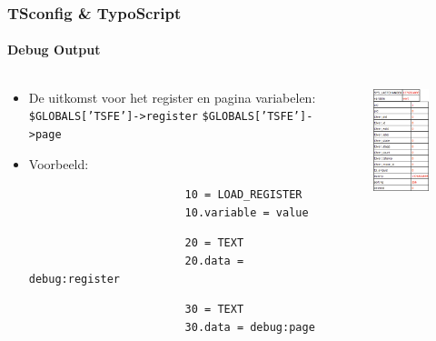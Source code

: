 \begin{frame}[fragile]
	\frametitle{TSconfig \& TypoScript}
	\framesubtitle{Debug Output}

	\begin{columns}[T]

		\begin{column}{.6\textwidth}
			\begin{itemize}
				\item De uitkomst voor het register en pagina variabelen:\newline
					\texttt{\$GLOBALS['TSFE']->register}\newline
					\texttt{\$GLOBALS['TSFE']->page}

				\item Voorbeeld:

					\begin{lstlisting}
						10 = LOAD_REGISTER
						10.variable = value
					\end{lstlisting}

					\begin{lstlisting}
						20 = TEXT
						20.data = debug:register
					\end{lstlisting}

					\begin{lstlisting}
						30 = TEXT
						30.data = debug:page
					\end{lstlisting}

			\end{itemize}
		\end{column}

		\begin{column}{.4\textwidth}
			\begin{figure}\vspace*{-0.4cm}
				\includegraphics[width=0.6\linewidth]{Images/TypoScript/DebugRegisterAndPage.png}
			\end{figure}
		\end{column}


\end{columns}
\end{frame}
